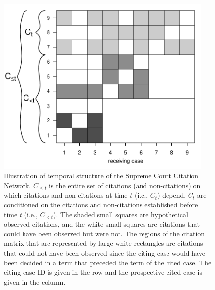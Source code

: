 \documentclass[headsepline=true, abstracton]{scrartcl}
\begin{document}
\begin{figure}[htp]
\centering
\includegraphics[width = 0.95\textwidth,trim= 0cm 0cm 0cm 0cm,clip=true  ]{images/daggish.pdf}
\caption{Illustration of temporal structure of the Supreme Court Citation Network. $C_{\leq t}$ is the entire set of citations (and non-citations) on which citations and non-citations at time $t$ (i.e., $C_t$) depend. $C_t$ are conditioned on the citations and non-citations established before time $t$ (i.e., $C_{< t}$). The shaded small squares are hypothetical observed citations, and the white small squares are citations that could have been observed but were not. The regions of the citation matrix that are represented by large white rectangles are citations that could not have been observed since the citing case would have been decided in a term that preceded the term of the cited case. The citing case ID is given in the row and the prospective cited case is given in the column. }
\label{fig:ctergm}
\end{figure}
\end{document}
